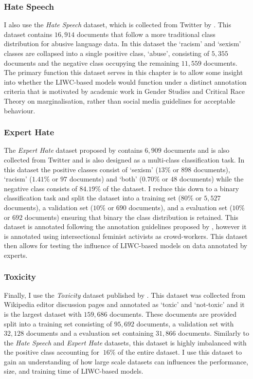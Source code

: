 \subsubsection{Hate Speech}
I also use the \textit{Hate Speech} dataset, which is collected from Twitter by \citet{Waseem-Hovy:2016}. This dataset contains $16,914$ documents that follow a more traditional class distribution for abusive language data. In this dataset the  `racism' and `sexism' classes are collapsed into a single positive class, `abuse', consisting of $5,355$ documents and the negative class occupying the remaining $11,559$ documents. The primary function this dataset serves in this chapter is to allow some insight into whether the LIWC-based models would function under a distinct annotation criteria that is motivated by academic work in Gender Studies and Critical Race Theory on marginalisation, rather than social media guidelines for acceptable behaviour.

\subsubsection{Expert Hate}
The \textit{Expert Hate} dataset proposed by \citet{Waseem:2016} contains $6,909$ documents and is also collected from Twitter and is also designed as a multi-class classification task. In this dataset the positive classes consist of `sexism' ($13\%$ or $898$ documents), `racism' ($1.41\%$ or $97$ documents) and `both' ($0.70\%$ or $48$ documents) while the negative class consists of $84.19\%$ of the dataset. I reduce this down to a binary classification task and split the dataset into a training set ($80\%$ or $5,527$ documents), a validation set ($10\%$ or $690$ documents), and a evaluation set ($10\%$ or $692$ documents) ensuring that binary the class distribution is retained. This dataset is annotated following the annotation guidelines proposed by \citet{Waseem-Hovy:2016}, however it is annotated using intersectional feminist activists as crowd-workers. This dataset then allows for testing the influence of LIWC-based models on data annotated by experts.

\subsubsection{Toxicity}
Finally, I use the \textit{Toxicity} dataset published by \citet{Wulczyn:2017}. This dataset was collected from Wikipedia editor discussion pages and annotated as `toxic' and `not-toxic' and it is the largest dataset with $159,686$ documents. These documents are provided split into a training set consisting of $95,692$ documents, a validation set with $32,128$ documents and a evaluation set containing $31,866$ documents. Similarly to the \textit{Hate Speech} and \textit{Expert Hate} datasets, this dataset is highly imbalanced with the positive class accounting for $~16\%$ of the entire dataset. I use this dataset to gain an understanding of how large scale datasets can influences the performance, size, and training time of LIWC-based models.

